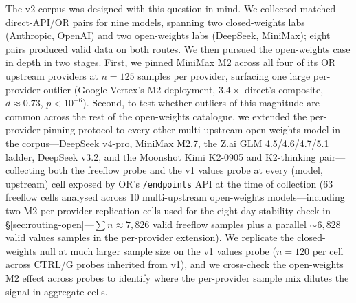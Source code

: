 \documentclass[11pt,a4paper]{article}
\begin{document}
The v2 corpus was designed with this question in mind. We collected matched direct-API/OR pairs for nine models, spanning two closed-weights labs (Anthropic, OpenAI) and two open-weights labs (DeepSeek, MiniMax); eight pairs produced valid data on both routes. We then pursued the open-weights case in depth in two stages. First, we pinned MiniMax M2 across all four of its OR upstream providers at $n{=}125$ samples per provider, surfacing one large per-provider outlier (Google Vertex's M2 deployment, $3.4\times$ direct's composite, $d \approx 0.73$, $p<10^{-6}$). Second, to test whether outliers of this magnitude are common across the rest of the open-weights catalogue, we extended the per-provider pinning protocol to every other multi-upstream open-weights model in the corpus---DeepSeek v4-pro, MiniMax M2.7, the Z.ai GLM 4.5/4.6/4.7/5.1 ladder, DeepSeek v3.2, and the Moonshot Kimi K2-0905 and K2-thinking pair---collecting both the freeflow probe and the v1 values probe at every (model, upstream) cell exposed by OR's \texttt{/endpoints} API at the time of collection (63 freeflow cells analysed across 10 multi-upstream open-weights models---including two M2 per-provider replication cells used for the eight-day stability check in \S\ref{sec:routing-open}---$\sum n \approx 7{,}826$ valid freeflow samples plus a parallel $\sim 6{,}828$ valid values samples in the per-provider extension). We replicate the closed-weights null at much larger sample size on the v1 values probe ($n{=}120$ per cell across CTRL/G probes inherited from v1), and we cross-check the open-weights M2 effect across probes to identify where the per-provider sample mix dilutes the signal in aggregate cells.
\end{document}
